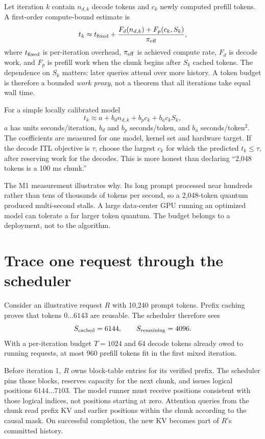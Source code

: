 
Let iteration $k$ contain $n_{d,k}$ decode tokens and $c_k$ newly computed prefill
tokens. A first-order compute-bound estimate is
\begin{equation}
t_k \approx t_{\rm fixed} +
 \frac{F_d(n_{d,k})+F_p(c_k,S_k)}{\pi_{\rm eff}},
\label{eq:chunk-time}
\end{equation}
where $t_{\rm fixed}$ is per-iteration overhead, $\pi_{\rm eff}$ is achieved compute
rate, $F_d$ is decode work, and $F_p$ is prefill work when the chunk begins after
$S_k$ cached tokens. The dependence on $S_k$ matters: later queries attend over more
history. A token budget is therefore a bounded \emph{work proxy}, not a theorem that
all iterations take equal wall time.

For a simple locally calibrated model
\[
t_k \approx a + b_d n_{d,k} + b_p c_k + b_a c_k S_k,
\]
$a$ has units seconds/iteration, $b_d$ and $b_p$ seconds/token, and $b_a$
seconds/token$^2$. The coefficients are measured for one model, kernel set and
hardware target. If the decode ITL objective is $\tau$, choose the largest $c_k$ for
which the predicted $t_k\le\tau$, after reserving work for the decodes. This is more
honest than declaring ``2,048 tokens is a 100 ms chunk.''

The M1 measurement illustrates why. Its long prompt processed near hundreds rather
than tens of thousands of tokens per second, so a 2,048-token quantum produced
multi-second stalls. A large data-center GPU running an optimized model can tolerate
a far larger token quantum. The budget belongs to a deployment, not to the algorithm.

\section{Trace one request through the scheduler}

Consider an illustrative request $R$ with 10,240 prompt tokens. Prefix caching proves
that tokens $0\ldots6143$ are reusable. The scheduler therefore sees
\[
S_{\rm cached}=6144,\qquad
S_{\rm remaining}=4096.
\]
With a per-iteration budget $T=1024$ and 64 decode tokens already owed to running
requests, at most 960 prefill tokens fit in the first mixed iteration.

Before iteration 1, $R$ owns block-table entries for its verified prefix. The
scheduler pins those blocks, reserves capacity for the next chunk, and issues logical
positions $6144\ldots7103$. The model runner must receive positions consistent with
those logical indices, not positions starting at zero. Attention queries from the
chunk read prefix KV and earlier positions within the chunk according to the causal
mask. On successful completion, the new KV becomes part of $R$'s committed history.

